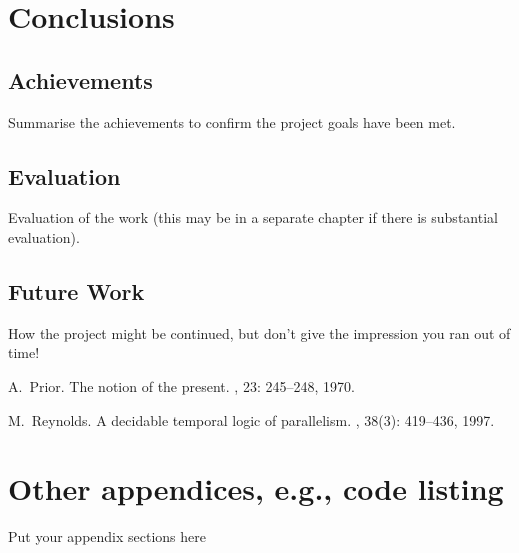 \documentclass[a4paper]{report}
\begin{document}
\chapter{Conclusions}
\section{Achievements}
Summarise the achievements to confirm the project goals have been met.
\section{Evaluation}
Evaluation of the work (this may be in a separate chapter if there is substantial evaluation).

\section{Future Work}
How the project might be continued, but don't give the impression you ran out of time!

\appendix


\begin{thebibliography}{HHM99}


A.~Prior.
\newblock The notion of the present.
, 23:  245--248, 1970.


M.~Reynolds.
\newblock A decidable temporal logic of parallelism.
, 38(3):  419--436,
  1997.
\end{thebibliography}
\chapter{Other appendices, e.g., code listing}
Put your appendix sections here
\end{document}
